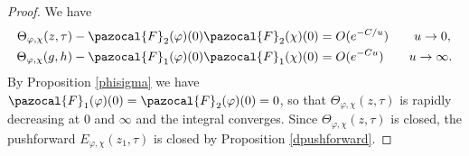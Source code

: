 \documentclass[a4paper,11pt]{amsart} %
\newcommand{\8}{\infty}
\newcommand{\four}{\pazocal{F}}
\theoremstyle{mytheoremstyle}
\theoremstyle{remark}
\numberwithin{equation}{section}
\begin{document}
\begin{proof} We have
\begin{align}
\Theta_{\varphi, \chi}(z,\tau)-\four_2(\varphi)(0)\four_2(\chi)(0) & =O( e^{-C/u}) \qquad u \rightarrow 0, \\
\Theta_{\varphi, \chi}(g,h)-\four_1(\varphi)(0)\four_1(\chi)(0) & =O(e^{-Cu}) \qquad u \rightarrow \8.
\end{align}
By Proposition \ref{phisigma} we have $\four_1(\varphi)(0)=\four_2(\varphi)(0)=0$, so that $\Theta_{\varphi, \chi}(z,\tau)$ is rapidly decreasing at $0$ and $\8$ and the integral converges. Since $\Theta_{\varphi, \chi}(z,\tau)$ is closed, the pushforward $E_{\varphi, \chi}(z_1,\tau)$ is closed by Proposition \ref{dpushforward}.
%
%
\end{proof}
\end{document}
